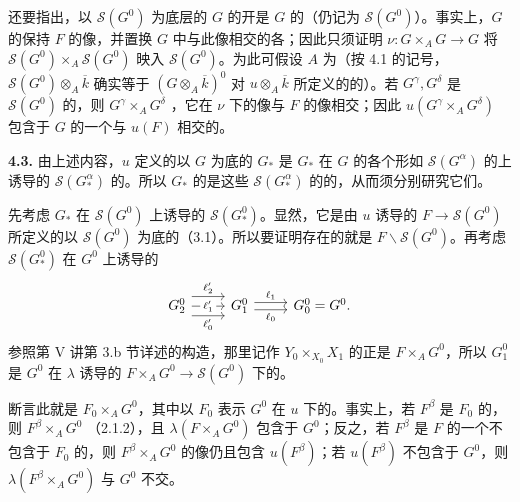还要指出，以 $\mathscr S(G^0)$ 为底层的 $G$ 的开是 $G$ 的（仍记为 $\mathscr S(G^0)$）。事实上，$G$ 的保持 $F$ 的像，并置换 $G$ 中与此像相交的各；因此只须证明 $\nu:G\times_A G\to G$ 将 $\mathscr S(G^0)\times_A\mathscr S(G^0)$ 映入 $\mathscr S(G^0)$。为此可假设 $A$ 为（按 4.1 的记号，$\mathscr S(G^0)\otimes_A\overline k$ 确实等于 $(G\otimes_A\overline k)^0$ 对 $u\otimes_A\overline k$ 所定义的的）。若 $G^\gamma,G^\delta$ 是 $\mathscr S(G^0)$ 的，则 $G^\gamma\times_A G^\delta$ ，它在 $\nu$ 下的像与 $F$ 的像相交；因此 $u(G^\gamma\times_A G^\delta)$ 包含于 $G$ 的一个与 $u(F)$ 相交的。

\textbf{4.3.} 由上述内容，$u$ 定义的以 $G$ 为底的 $G_*$ 是 $G_*$ 在 $G$ 的各个形如 $\mathscr S(G^\alpha)$ 的上诱导的 $\mathscr S(G^\alpha_*)$ 的。所以 $G_*$ 的是这些 $\mathscr S(G^\alpha_*)$ 的的，从而须分别研究它们。

先考虑 $G_*$ 在 $\mathscr S(G^0)$ 上诱导的 $\mathscr S(G^0_*)$。显然，它是由 $u$ 诱导的 $F\to\mathscr S(G^0)$ 所定义的以 $\mathscr S(G^0)$ 为底的（3.1）。所以要证明存在的就是 $F\backslash\mathscr S(G^0)$。再考虑 $\mathscr S(G^0_*)$ 在 $G^0$ 上诱导的
\[
\begin{tikzcd}
G^0_2\arrow[r,shift left=1.6ex,"\ell'_2"]\arrow[r,"\ell'_1" description]\arrow[r,shift right=1.6ex,"\ell'_0"']&G^0_1\arrow[r,shift left=.6ex,"\ell_1"]\arrow[r,shift right=.6ex,"\ell_0"']&G^0_0=G^0.
\end{tikzcd}
\]
参照第 V 讲第 3.b 节详述的构造，那里记作 $Y_0\times_{X_0}X_1$ 的正是 $F\times_A G^0$，所以 $G^0_1$ 是 $G^0$ 在 $\lambda$ 诱导的 $F\times_A G^0\to\mathscr S(G^0)$ 下的。

断言此就是 $F_0\times_A G^0$，其中以 $F_0$ 表示 $G^0$ 在 $u$ 下的。事实上，若 $F^\beta$ 是 $F_0$ 的，则 $F^\beta\times_A G^0$ （2.1.2），且 $\lambda(F\times_A G^0)$ 包含于 $G^0$；反之，若 $F^\beta$ 是 $F$ 的一个不包含于 $F_0$ 的，则 $F^\beta\times_A G^0$ 的像仍且包含 $u(F^\beta)$；若 $u(F^\beta)$ 不包含于 $G^0$，则 $\lambda(F^\beta\times_A G^0)$ 与 $G^0$ 不交。

